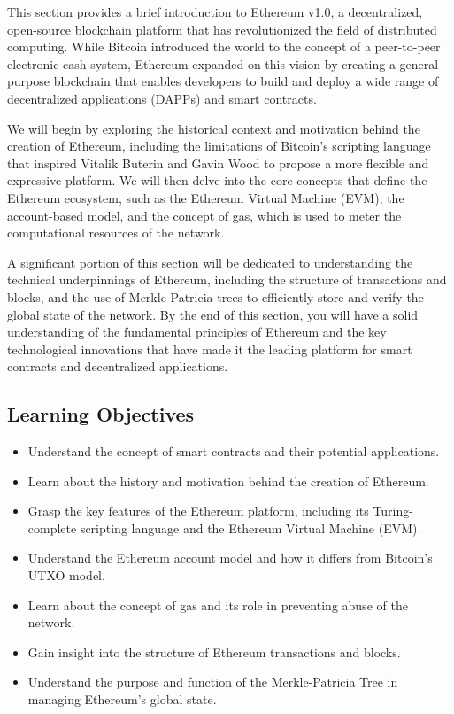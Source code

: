 This section provides a brief introduction to Ethereum v1.0, a
decentralized, open-source blockchain platform that has revolutionized
the field of distributed computing. While Bitcoin introduced the world
to the concept of a peer-to-peer electronic cash system, Ethereum
expanded on this vision by creating a general-purpose blockchain that
enables developers to build and deploy a wide range of decentralized
applications (DAPPs) and smart contracts.

We will begin by exploring the historical context and motivation behind
the creation of Ethereum, including the limitations of Bitcoin's
scripting language that inspired Vitalik Buterin and Gavin Wood to propose a more
flexible and expressive platform. We will then delve into the core
concepts that define the Ethereum ecosystem, such as the Ethereum
Virtual Machine (EVM), the account-based model, and the concept of gas,
which is used to meter the computational resources of the network.

A significant portion of this section will be dedicated to understanding
the technical underpinnings of Ethereum, including the structure of
transactions and blocks, and the use of Merkle-Patricia trees to
efficiently store and verify the global state of the network. By the end
of this section, you will have a solid understanding of the fundamental
principles of Ethereum and the key technological innovations that have
made it the leading platform for smart contracts and decentralized
applications.

\subsection{Learning Objectives}\label{learning-objectives}

\begin{itemize}
	\tightlist
	\item
	Understand the concept of smart contracts and their potential
	applications.
	\item
	Learn about the history and motivation behind the creation of
	Ethereum.
	\item
	Grasp the key features of the Ethereum platform, including its
	Turing-complete scripting language and the Ethereum Virtual Machine
	(EVM).
	\item
	Understand the Ethereum account model and how it differs from
	Bitcoin's UTXO model.
	\item
	Learn about the concept of gas and its role in preventing abuse of the
	network.
	\item
	Gain insight into the structure of Ethereum transactions and blocks.
	\item
	Understand the purpose and function of the Merkle-Patricia Tree in
	managing Ethereum's global state.
\end{itemize}

